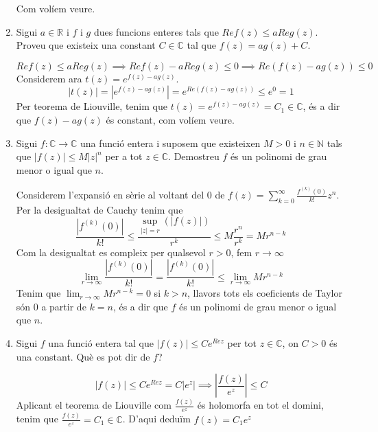 \documentclass[10pt,a4paper]{article}
\begin{document}
\begin{enumerate}
\begin{framed}
Com volíem  veure.
\end{framed}
\newpage
\item Sigui $a\in\mathbb{R}$ i $f$ i $g$ dues funcions enteres tals que $Ref(z)\leq aReg(z)$. Proveu que existeix una constant $C\in\mathbb{C}$ tal que $f(z)=ag(z)+C$.
\begin{framed}
$$Ref(z)\leq aReg(z) \implies Ref(z)-aReg(z)\leq 0 \implies Re(f(z)-ag(z)) \leq 0$$
Considerem ara $t(z) = e^{f(z)-ag(z)}$.
$$|t(z)|=|e^{f(z)-ag(z)}| = e^{Re(f(z)-ag(z))} \leq e^{0} = 1$$
Per teorema de Liouville, tenim que $t(z)=e^{f(z)-ag(z)}=C_{1}\in\mathbb{C}$, és a dir que $f(z)-ag(z)$ és constant, com volíem veure.
\end{framed}
\item Sigui $f:\mathbb{C}\rightarrow\mathbb{C}$ una funció entera i suposem que existeixen $M>0$ i $n\in\mathbb{N}$ tals que $|f(z)|\leq M|z|^{n}$ per a tot $z\in\mathbb{C}$. Demostreu $f$ és un polinomi de grau menor o igual que $n$.
\begin{framed}
Considerem l'expansió en sèrie al voltant del 0 de $f(z) = \sum_{k=0}^{\infty}\frac{f^{(k)}(0)}{k!}z^{n}$.
Per la desigualtat de Cauchy tenim que 
$$\frac{|f^{(k)}(0)|}{k!} \leq \frac{\sup_{|z|=r}(|f(z)|)}{r^{k}} \leq M\frac{r^n}{r^{k}} = Mr^{n-k}$$
Com la desigualtat es compleix per qualsevol $r>0$, fem $r\to\infty$
$$\lim_{r\to\infty}\frac{|f^{(k)}(0)|}{k!} = \frac{|f^{(k)}(0)|}{k!} \leq \lim_{r\to\infty}Mr^{n-k}$$
Tenim que $\lim_{r\to\infty}Mr^{n-k}=0$ si $k>n$, llavors tots els coeficients de Taylor són 0 a partir de $k=n$, és a dir que $f$ és un polinomi de grau menor o igual que $n$. 
\end{framed}
\item Sigui $f$ una funció entera tal que $|f(z)|\leq Ce^{Rez}$ per tot $z\in\mathbb{C}$, on $C>0$ és una constant. Què es pot dir de $f$?
\begin{framed}
$$|f(z)|\leq Ce^{Rez} = C|e^{z}| \implies \left|\frac{f(z)}{e^{z}}\right|\leq C$$
Aplicant el teorema de Liouville com $\frac{f(z)}{e^{z}}$ és holomorfa en tot el domini, tenim que $\frac{f(z)}{e^{z}} = C_{1}\in\mathbb{C}$. D'aqui deduïm $f(z) = C_{1}e^{z}$
\end{framed}	
		
\end{enumerate}
\end{document}
